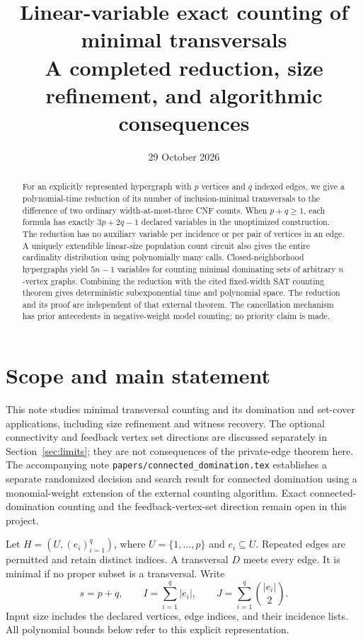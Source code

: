 \documentclass[11pt]{article}
\title{Linear-variable exact counting of minimal transversals\\
\large A completed reduction, size refinement, and algorithmic consequences}
\author{}
\date{29 October 2026}
\theoremstyle{remark}\newtheorem{remark}[theorem]{Remark}
\begin{document}
\maketitle
\begin{abstract}
For an explicitly represented hypergraph with $p$ vertices and $q$ indexed
edges, we give a polynomial-time reduction of its number of inclusion-minimal
transversals to the difference of two ordinary width-at-most-three CNF counts.
When $p+q\ge1$, each formula has exactly $3p+2q-1$ declared variables in the
unoptimized construction. The reduction has no auxiliary variable per incidence
or per pair of vertices in an edge. A uniquely extendible linear-size population
count circuit also gives the entire cardinality distribution using polynomially
many calls. Closed-neighborhood hypergraphs yield $5n-1$ variables for counting
minimal dominating sets of arbitrary $n$-vertex graphs. Combining the reduction
with the cited fixed-width SAT counting theorem gives deterministic
subexponential time and polynomial space. The reduction and its proof are
independent of that external theorem. The cancellation mechanism has prior
antecedents in negative-weight model counting; no priority claim is made.
\end{abstract}

\section{Scope and main statement}
This note studies minimal transversal counting and its
domination and set-cover applications, including size
refinement and witness recovery. The optional connectivity and feedback vertex
set directions are discussed separately in Section~\ref{sec:limits}; they are
not consequences of the private-edge theorem here. The accompanying note
\texttt{papers/connected\_domination.tex} establishes a separate randomized
decision and search result for connected domination using a monomial-weight
extension of the external counting algorithm. Exact connected-domination
counting and the feedback-vertex-set direction remain open in this project.

Let $H=(U,(e_i)_{i=1}^q)$, where $U=\{1,\ldots,p\}$ and $e_i\subseteq U$.
Repeated edges are permitted and retain distinct indices. A transversal $D$
meets every edge. It is minimal if no proper subset is a transversal. Write
\[
 s=p+q,\qquad I=\sum_{i=1}^q |e_i|,\qquad
 J=\sum_{i=1}^q\binom{|e_i|}{2}.
\]
Input size includes the declared vertices, edge indices, and their incidence
lists. All polynomial bounds below refer to this explicit representation.
\end{document}

